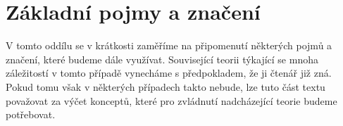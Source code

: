\section{Základní pojmy a značení}\label{sec:zakladni-pojmy-a-znaceni}

V tomto oddílu se v krátkosti zaměříme na připomenutí některých pojmů a značení, které budeme dále využívat. Související teorii týkající se mnoha záležitostí v tomto případě vynecháme s předpokladem, že ji čtenář již zná. Pokud tomu však v některých případech takto nebude, lze tuto část textu považovat za výčet konceptů, které pro zvládnutí nadcházející teorie budeme potřebovat.

